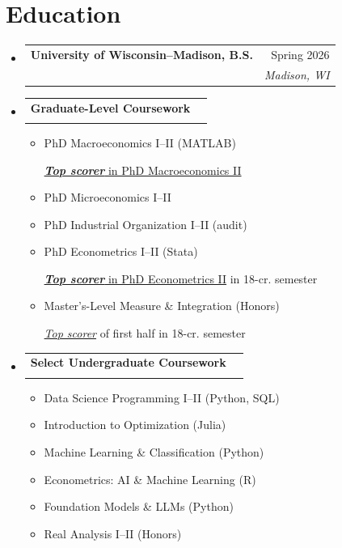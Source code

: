\documentclass[letterpaper,11pt]{article}
\makeatletter
\newcommand{\resumeSubheading}[4]{\vspace{-2pt}\item
  \begin{tabular*}{0.97\textwidth}[t]{l@{\extracolsep{\fill}}r}
    \textbf{#1} & #2 \\
    \textit{\small#3} & \textit{\small #4} \\
  \end{tabular*}\vspace{-7pt}}
\newcommand{\resumeSubHeadingListStart}{\begin{itemize}[leftmargin=0.15in, label={}]}
\newcommand{\resumeSubHeadingListEnd}{\end{itemize}}
\makeatother
\begin{document}
\section{Education}
  \resumeSubHeadingListStart
    \resumeSubheading
      {University of Wisconsin--Madison, B.S.}{Spring 2026}
      {\parbox[t]{0.65\textwidth}{Triple Major: Economics, Mathematics, and Data Science \\ \textnormal{\textbf{Recent GPA (since Summer 2024): 3.9} $|$ Overall GPA: 3.3}}}{Madison, WI}%
      \vspace{2mm}
    \resumeSubheading
      {Graduate-Level Coursework}{}{}{}
      \vspace{-5.5mm}
      \begin{multicols}{2}
      \begin{itemize}[label={}]
        \item PhD Macroeconomics I--II (MATLAB) \parbox[t]{0.5\textwidth}{\vspace{-0.8em} \footnotesize \underline{\textbf{\textit{Top scorer}} in PhD Macroeconomics II}}
        \item PhD Microeconomics I--II
        \item PhD Industrial Organization I--II (audit)
        \item PhD Econometrics I--II (Stata) \parbox[t]{0.5\textwidth}{\vspace{-0.8em} \footnotesize \underline{\textbf{\textit{Top scorer}} in PhD Econometrics II} in 18-cr. semester}
        \item Master’s-Level Measure \& Integration (Honors) \parbox[t]{0.5\textwidth}{\vspace{-0.9em} \footnotesize \underline{\textit{Top scorer}} of first half in 18-cr. semester}
      \end{itemize}
      \end{multicols}
      \vspace{-5mm}
    \resumeSubheading
      {Select Undergraduate Coursework}{}{}{}
      \vspace{-5.5mm}
      \begin{multicols}{2}
      \begin{itemize}[label={}]
          \item Data Science Programming I--II (Python, SQL)
          \item Introduction to Optimization (Julia)
          \item Machine Learning \& Classification (Python)
          \item Econometrics: AI \& Machine Learning (R)
          \item Foundation Models \& LLMs (Python)
          \item Real Analysis I--II (Honors)
      \end{itemize}
      \end{multicols}
  \resumeSubHeadingListEnd
\end{document}
